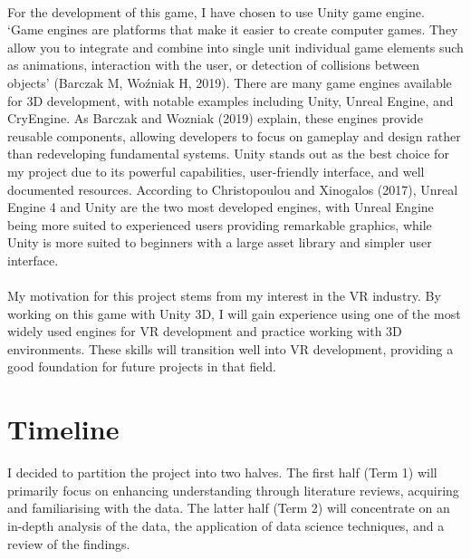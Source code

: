 \documentclass[12pt]{article}
\begin{document}
\paragraph{}
For the development of this game, I have chosen to use Unity game engine. ‘Game engines are platforms that make it easier to create computer games. They allow you to integrate and combine into single unit individual game elements such as animations, interaction with the user, or detection of collisions between objects’ (Barczak M, Woźniak H, 2019). There are many game engines available for 3D development, with notable examples including Unity, Unreal Engine, and CryEngine. As Barczak and Wozniak (2019) explain, these engines provide reusable components, allowing developers to focus on gameplay and design rather than redeveloping fundamental systems. Unity stands out as the best choice for my project due to its powerful capabilities, user-friendly interface, and well documented resources. According to Christopoulou and Xinogalos (2017), Unreal Engine 4 and Unity are the two most developed engines, with Unreal Engine being more suited to experienced users providing remarkable graphics, while Unity is more suited to beginners with a large asset library and simpler user interface.
\paragraph{}

\paragraph{}
My motivation for this project stems from my interest in the VR industry. By working on this game with Unity 3D, I will gain experience using one of the most widely used engines for VR development and practice working with 3D environments. These skills will transition well into VR development, providing a good foundation for future projects in that field.


\section{Timeline}
I decided to partition the project into two halves. The first half (Term 1) will primarily focus on enhancing understanding through literature reviews, acquiring and familiarising with the data. The latter half (Term 2) will concentrate on an in-depth analysis of the data, the application of data science techniques, and a review of the findings.
\end{document}
